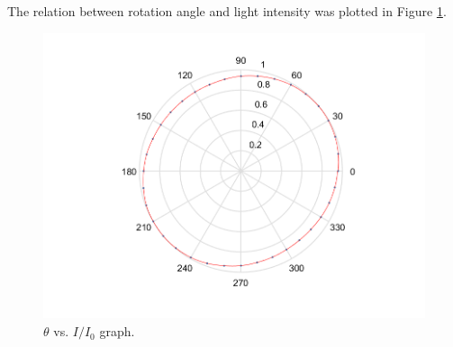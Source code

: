 The relation between rotation angle and light intensity was plotted in Figure \ref{fig-deg-45}.
\begin{figure}[H]
\centering
\includegraphics[scale=0.5]{deg-45.png}
\caption{$\theta$ vs. $I/I_0$ graph.}
\label{fig-deg-45}
\end{figure}
